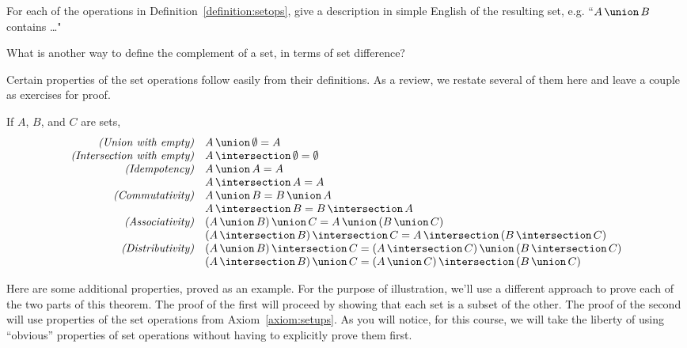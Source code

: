 \begin{exer1}
For each of the operations in Definition~\ref{definition:setops}, give a description in simple English of the resulting set, e.g. ``$\setunion{A}{B}$ contains \ldots"
\end{exer1}

\begin{exer1}
What is another way to define the complement of a set, in terms of set difference?
\end{exer1}

\begin{discussion}
Certain properties of the set operations follow easily from their definitions. As a review, we restate several of them here and leave a couple as exercises for proof. 
\end{discussion}

\begin{axiom}\label{axiom:setups}
If $A$, $B$, and $C$ are sets, 
\[\begin{array}{rl}
\textit{(Union with empty)}	& \setunion{A}{\emptyset} = A \\
\textit{(Intersection with empty)}	& \setintersection{A}{\emptyset} = \emptyset \\
\textit{(Idempotency)} 	& \setunion{A}{A} = A \\
					& \setintersection{A}{A} = A \\
\textit{(Commutativity)} 	& \setunion{A}{B} = \setunion{B}{A} \\
					&  \setintersection{A}{B} = \setintersection{B}{A} \\
\textit{(Associativity)}		& \setunion{(\setunion{A}{B})}{C} = \setunion{A}{(\setunion{B}{C})} \\
					& \setintersection{(\setintersection{A}{B})}{C} = \setintersection{A}{(\setintersection{B}{C})} \\
\textit{(Distributivity)}		& \setintersection{(\setunion{A}{B})}{C} = \setunion{(\setintersection{A}{C})}
															{(\setintersection{B}{C})} \\
					& \setunion{(\setintersection{A}{B})}{C} = \setintersection{(\setunion{A}{C})}
															{(\setunion{B}{C})} \\
\end{array}\]
\end{axiom}

\begin{discussion}
Here are some additional properties, proved as an example. For the purpose of illustration, we'll use a different approach to prove each of the two parts of this theorem. The proof of the first will proceed by showing that each set is a subset of the other. The proof of the second will use properties of the set operations from Axiom~\ref{axiom:setups}. As you will notice, for this course, we will take the liberty of using ``obvious'' properties of set operations without having to explicitly prove them first.
\end{discussion}

